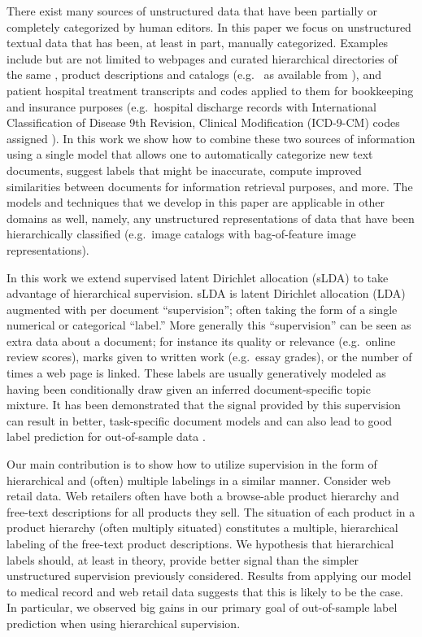 There exist many sources of unstructured data that have been partially or completely categorized by human editors.  In this paper we focus on unstructured textual data that has been, at least in part, manually categorized.  Examples include but are not limited to webpages and curated hierarchical directories of the same \citep{DMOZ}, product descriptions and catalogs (e.g.~\citep{AMAZON} as available from \citep{SNAP}), and patient hospital treatment transcripts and  codes applied to them for bookkeeping and insurance purposes (e.g.~hospital discharge records with International Classification of Disease 9th Revision,
Clinical Modification (ICD-9-CM) codes assigned \cite{ICD9}).  In this work we show how to combine these two sources of information using a single model that allows one to automatically categorize new text documents, suggest labels that might be inaccurate, compute improved similarities between documents for information retrieval purposes, and more.  The models and techniques that we develop in this paper are applicable in other domains as well, namely, any unstructured representations of data that have been hierarchically classified (e.g.~image catalogs with bag-of-feature image representations). 

In this work we extend supervised latent Dirichlet allocation (sLDA) \cite{BleiMcAuliffe2008} to take advantage of hierarchical supervision.  sLDA is latent Dirichlet allocation (LDA) \cite{Blei2003} augmented with per document ``supervision'';  often taking the form of a single numerical or categorical ``label.''  More generally this ``supervision'' can be seen as extra data  about a document;  for instance its quality or relevance (e.g.~online review scores), marks given to written work (e.g.~essay grades), or the number of times a web page is linked.  These labels are usually generatively modeled as having been conditionally draw given an inferred document-specific topic mixture.  It has been demonstrated that the signal provided by this supervision can result in better, task-specific document models and can also lead to good label prediction for out-of-sample data \cite{BleiMcAuliffe2008}.

Our main contribution is to show how to utilize supervision in the form of  hierarchical and (often) multiple labelings in a similar manner.   Consider web retail data.  Web retailers often have both a browse-able product hierarchy and free-text descriptions for all products they sell.   The situation of each product in a product hierarchy (often multiply situated) constitutes a multiple, hierarchical labeling of the free-text product descriptions.  We hypothesis that hierarchical labels should, at least in theory, provide better signal than the simpler unstructured supervision previously considered.  Results from applying our model to medical record and web retail data suggests that this is likely to be the case.  In particular, we observed big gains in our primary goal of out-of-sample label prediction when using hierarchical supervision. 

